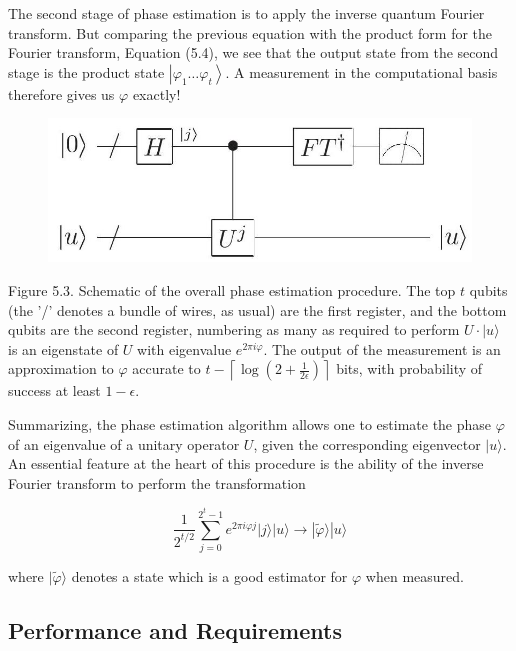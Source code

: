 The second stage of phase estimation is to apply the inverse quantum Fourier transform. But comparing the previous equation with the product form for the Fourier transform, Equation (5.4), we see that the output state from the second stage is the product state $\left|\varphi_{1} \ldots \varphi_{t}\right\rangle$. A measurement in the computational basis therefore gives us $\varphi$ exactly!

\begin{figure}
\centering
\includegraphics[width=0.75\linewidth]{Images/2024_05_17_6977ce60de6fd27aef98g-257}
\end{figure}

Figure 5.3. Schematic of the overall phase estimation procedure. The top $t$ qubits (the '/' denotes a bundle of wires, as usual) are the first register, and the bottom qubits are the second register, numbering as many as required to perform $U \cdot|u\rangle$ is an eigenstate of $U$ with eigenvalue $e^{2 \pi i \varphi}$. The output of the measurement is an approximation to $\varphi$ accurate to $t-\left\lceil\log \left(2+\frac{1}{2 \epsilon}\right)\right\rceil$ bits, with probability of success at least $1-\epsilon$.

Summarizing, the phase estimation algorithm allows one to estimate the phase $\varphi$ of an eigenvalue of a unitary operator $U$, given the corresponding eigenvector $|u\rangle$. An essential feature at the heart of this procedure is the ability of the inverse Fourier transform to perform the transformation

\begin{equation}
    \frac{1}{2^{t / 2}} \sum_{j=0}^{2^{t}-1} e^{2 \pi i \varphi j}|j\rangle|u\rangle \rightarrow|\tilde{\varphi}\rangle|u\rangle \tag{5.22}
\end{equation}

where $|\tilde{\varphi}\rangle$ denotes a state which is a good estimator for $\varphi$ when measured.

\subsection{Performance and Requirements}

